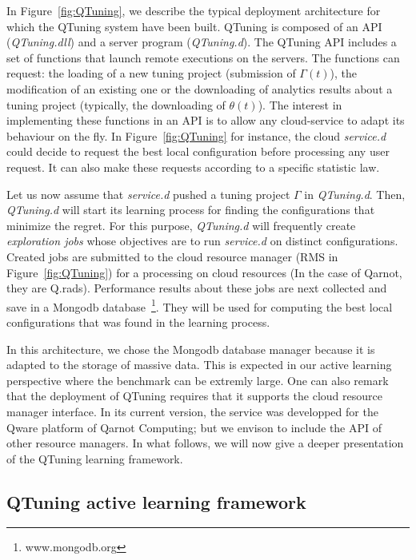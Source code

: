 \documentclass[10pt, conference, compsocconf]{IEEEtran}
\begin{document}
In Figure~\ref{fig:QTuning}, we describe the typical deployment architecture for which the
QTuning system have been built. QTuning is composed of an API ({\it QTuning.dll}) and
a server program ({\it QTuning.d}). The QTuning API includes a set of functions that
launch remote executions on the servers. The functions can request: the loading of a new tuning project (submission of
$\Gamma(t)$), the modification of an existing one or the downloading of analytics results about a tuning project
(typically, the downloading of $\theta(t)$). The interest in implementing these functions in an API is
to allow any cloud-service to adapt its behaviour on the fly. In Figure~\ref{fig:QTuning} for instance,
the cloud {\it service.d} could decide to request the best local configuration before processing any user request.
It can also make these requests according to a specific statistic law.

Let us now assume that {\it service.d} pushed a tuning project $\Gamma$ in  {\it QTuning.d}. Then,
{\it QTuning.d} will start its  learning process for finding the configurations that minimize the regret.
For this purpose, {\it QTuning.d} will frequently create {\it exploration jobs} whose objectives are to run
 {\it service.d} on distinct configurations. Created jobs are submitted to the cloud resource manager (RMS in
Figure~\ref{fig:QTuning}) for a processing on cloud resources (In the case of Qarnot, they are Q.rads).
Performance results about these jobs are next collected and save in a Mongodb database~\footnote{www.mongodb.org}.
They will be used for computing the best local configurations that was found in the learning process.

In this architecture, we chose the Mongodb database manager because it is adapted to the storage of massive data.
This is expected in our active learning perspective where the benchmark can be extremly large.
One can also remark that the deployment of QTuning requires that it supports the cloud resource manager
interface. In its current version, the service was developped for the Qware
platform of Qarnot Computing; but we envison to include the API of other resource managers.
In what follows, we will now give a deeper presentation of the QTuning learning framework.



\subsection{QTuning active learning framework}
\end{document}
